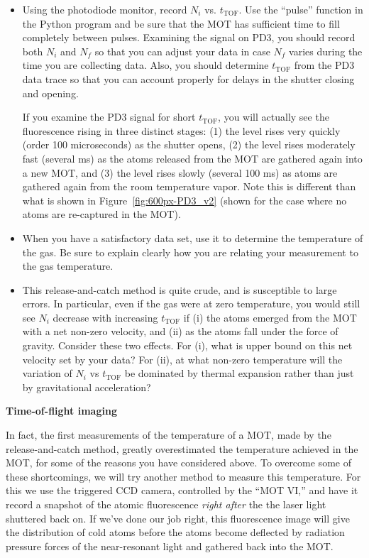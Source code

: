 \documentclass{../lab}
\begin{document}
\begin{itemize}
    \item Using the photodiode monitor, record $N_i$ vs. $t_\text{TOF}$. Use the ``pulse'' function in the Python program and be sure that the MOT has sufficient time to fill completely between pulses. Examining the signal on PD3, you should record both $N_i$ and $N_f$ so that you can adjust your data in case $N_f$ varies during the time you are collecting data. Also, you should determine $t_\text{TOF}$ from the PD3 data trace so that you can account properly for delays in the shutter closing and opening.

    If you examine the PD3 signal for short $t_\text{TOF}$, you will actually see the fluorescence rising in three distinct stages: (1) the level rises very quickly (order 100 microseconds) as the shutter opens, (2) the level rises moderately fast (several ms) as the atoms released from the MOT are gathered again into a new MOT, and (3) the level rises slowly (several 100 ms) as atoms are gathered again from the room temperature vapor. Note this is different than what is shown in Figure~\ref{fig:600px-PD3_v2} (shown for the case where no atoms are re-captured in the MOT).

    \item When you have a satisfactory data set, use it to determine the temperature of the gas. Be sure to explain clearly how you are relating your measurement to the gas temperature.

    \item This release-and-catch method is quite crude, and is susceptible to large errors. In particular, even if the gas were at zero temperature, you would still see $N_i$ decrease with increasing $t_\text{TOF}$ if (i) the atoms emerged from the MOT with a net non-zero velocity, and (ii) as the atoms fall under the force of gravity. Consider these two effects. For (i), what is upper bound on this net velocity set by your data? For (ii), at what non-zero temperature will the variation of $N_i$ vs $t_\text{TOF}$ be dominated by thermal expansion rather than just by gravitational acceleration?
\end{itemize}

\textbf{Time-of-flight imaging}

In fact, the first measurements of the temperature of a MOT, made by the release-and-catch method, greatly overestimated the temperature achieved in the MOT, for some of the reasons you have considered above. To overcome some of these shortcomings, we will try another method to measure this temperature. For this we use the triggered CCD camera, controlled by the ``MOT VI,'' and have it record a snapshot of the atomic fluorescence \emph{right after} the the laser light shuttered back on. If we've done our job right, this fluorescence image will give the distribution of cold atoms before the atoms become deflected by radiation pressure forces of the near-resonant light and gathered back into the MOT.
\end{document}
